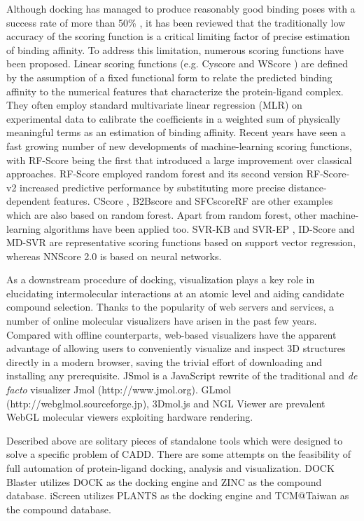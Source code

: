 \documentclass[a4paper,12pt]{article}
\begin{document}
Although docking has managed to produce reasonably good binding poses with a success rate of more than 50\% \citep{1362}, it has been reviewed \citep{1695} that the traditionally low accuracy of the scoring function is a critical limiting factor of precise estimation of binding affinity. To address this limitation, numerous scoring functions have been proposed. Linear scoring functions (e.g. Cyscore \citep{1372} and WScore \citep{1736}) are defined by the assumption of a fixed functional form to relate the predicted binding affinity to the numerical features that characterize the protein-ligand complex. They often employ standard multivariate linear regression (MLR) on experimental data to calibrate the coefficients in a weighted sum of physically meaningful terms as an estimation of binding affinity. Recent years have seen a fast growing number of new developments of machine-learning scoring functions, with RF-Score \citep{564} being the first that introduced a large improvement over classical approaches. RF-Score employed random forest and its second version RF-Score-v2 \citep{1370} increased predictive performance by substituting more precise distance-dependent features. CScore \citep{1194}, B2Bscore \citep{1410} and SFCscoreRF \citep{1347} are other examples which are also based on random forest. Apart from random forest, other machine-learning algorithms have been applied too. SVR-KB and SVR-EP \citep{963}, ID-Score \citep{1305} and MD-SVR \citep{1452} are representative scoring functions based on support vector regression, whereas NNScore 2.0 \citep{977} is based on neural networks.

As a downstream procedure of docking, visualization plays a key role in elucidating intermolecular interactions at an atomic level and aiding candidate compound selection. Thanks to the popularity of web servers and services, a number of online molecular visualizers have arisen in the past few years. Compared with offline counterparts, web-based visualizers have the apparent advantage of allowing users to conveniently visualize and inspect 3D structures directly in a modern browser, saving the trivial effort of downloading and installing any prerequisite. JSmol \citep{1314} is a JavaScript rewrite of the traditional and \textit{de facto} visualizer Jmol (http://www.jmol.org). GLmol (http://webglmol.sourceforge.jp), 3Dmol.js \citep{1652} and NGL Viewer \citep{1666} are prevalent WebGL molecular viewers exploiting hardware rendering.

Described above are solitary pieces of standalone tools which were designed to solve a specific problem of CADD. There are some attempts on the feasibility of full automation of protein-ligand docking, analysis and visualization. DOCK Blaster \citep{557} utilizes DOCK \citep{1222} as the docking engine and ZINC \citep{1178} as the compound database. iScreen \citep{899} utilizes PLANTS \citep{607,779} as the docking engine and TCM@Taiwan \citep{528} as the compound database.
\end{document}
